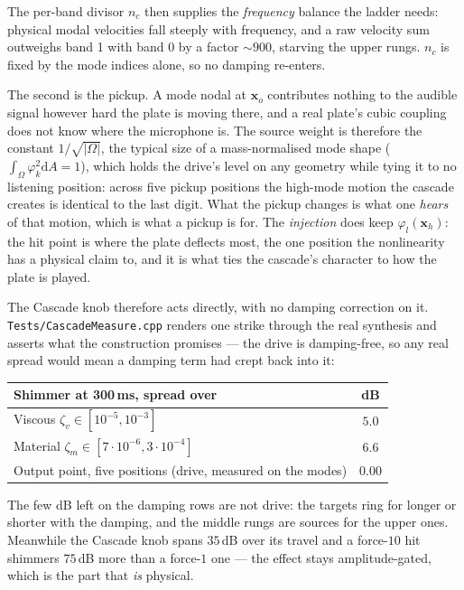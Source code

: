 \documentclass[11pt,a4paper]{article}
\newcommand{\dd}{\mathrm{d}}
\newcommand{\code}[1]{\texttt{#1}}
\begin{document}
The per-band divisor $n_c$ then supplies the \emph{frequency} balance the
ladder needs: physical modal velocities fall steeply with frequency, and a
raw velocity sum outweighs band 1 with band 0 by a factor $\sim\!900$,
starving the upper rungs. $n_c$ is fixed by the mode indices alone, so no
damping re-enters.

The second is the pickup. A mode nodal at $\bm{x}_o$ contributes nothing
to the audible signal however hard the plate is moving there, and a real
plate's cubic coupling does not know where the microphone is. The source
weight is therefore the constant $1/\sqrt{|\Omega|}$, the typical size of
a mass-normalised mode shape ($\int_\Omega \varphi_k^2 \dd A = 1$), which
holds the drive's level on any geometry while tying it to no listening
position: across five pickup positions the high-mode motion the cascade
creates is identical to the last digit. What the pickup changes is what
one \emph{hears} of that motion, which is what a pickup is for. The
\emph{injection} does keep $\varphi_l(\bm{x}_h)$: the hit point is where
the plate deflects most, the one position the nonlinearity has a physical
claim to, and it is what ties the cascade's character to how the plate is
played.

The Cascade knob therefore acts directly, with no damping correction on
it. \code{Tests/CascadeMeasure.cpp} renders one strike through the real
synthesis and asserts what the construction promises --- the drive is
damping-free, so any real spread would mean a damping term had crept back
into it:
%
\begin{center}
\begin{tabular}{lc}
\toprule
Shimmer at 300\,ms, spread over & dB \\
\midrule
Viscous $\zeta_v \in [10^{-5}, 10^{-3}]$              & $5.0$ \\
Material $\zeta_m \in [7\cdot10^{-6}, 3\cdot10^{-4}]$ & $6.6$ \\
Output point, five positions (drive, measured on the modes) & $0.00$ \\
\bottomrule
\end{tabular}
\end{center}
%
The few dB left on the damping rows are not drive: the targets ring for
longer or shorter with the damping, and the middle rungs are sources for
the upper ones. Meanwhile the Cascade knob spans $35$\,dB over its travel
and a force-$10$ hit shimmers $75$\,dB more than a force-$1$ one --- the
effect stays amplitude-gated, which is the part that \emph{is} physical.
\end{document}
